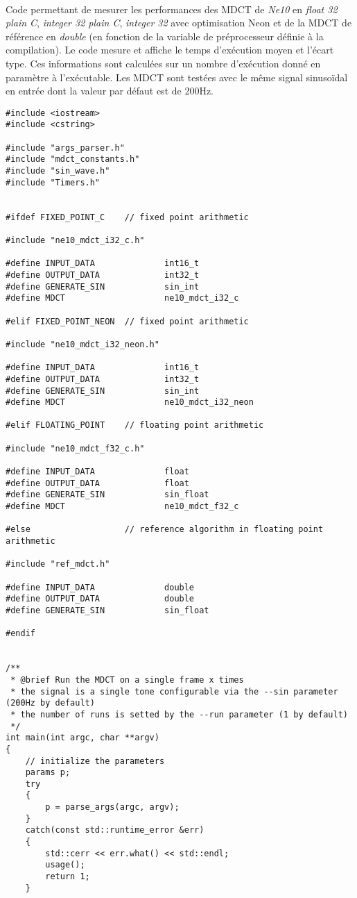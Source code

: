 \documentclass{article}
\begin{document}
\paragraph{}
Code permettant de mesurer les performances des MDCT de \emph{Ne10} en \emph{float 32 plain C}, \emph{integer 32 plain C}, \emph{integer 32} avec optimisation Neon et de la MDCT de référence en \emph{double} (en fonction de la variable de préprocesseur définie à la compilation). Le code mesure et affiche le temps d'exécution moyen et l'écart type. Ces informations sont calculées sur un nombre d'exécution donné en paramètre à l'exécutable. Les MDCT sont testées avec le même signal sinusoïdal en entrée dont la valeur par défaut est de 200Hz.
\lstset{language=C++}
\begin{lstlisting}
#include <iostream>
#include <cstring>

#include "args_parser.h"
#include "mdct_constants.h"
#include "sin_wave.h"
#include "Timers.h"


#ifdef FIXED_POINT_C    // fixed point arithmetic

#include "ne10_mdct_i32_c.h"

#define INPUT_DATA              int16_t
#define OUTPUT_DATA             int32_t
#define GENERATE_SIN            sin_int
#define MDCT                    ne10_mdct_i32_c

#elif FIXED_POINT_NEON  // fixed point arithmetic

#include "ne10_mdct_i32_neon.h"

#define INPUT_DATA              int16_t
#define OUTPUT_DATA             int32_t
#define GENERATE_SIN            sin_int
#define MDCT                    ne10_mdct_i32_neon

#elif FLOATING_POINT    // floating point arithmetic

#include "ne10_mdct_f32_c.h"

#define INPUT_DATA              float
#define OUTPUT_DATA             float
#define GENERATE_SIN            sin_float
#define MDCT                    ne10_mdct_f32_c

#else                   // reference algorithm in floating point arithmetic

#include "ref_mdct.h"

#define INPUT_DATA              double
#define OUTPUT_DATA             double
#define GENERATE_SIN            sin_float

#endif


/**
 * @brief Run the MDCT on a single frame x times
 * the signal is a single tone configurable via the --sin parameter (200Hz by default)
 * the number of runs is setted by the --run parameter (1 by default)
 */
int main(int argc, char **argv)
{
    // initialize the parameters
    params p;
    try
    {
        p = parse_args(argc, argv);
    }
    catch(const std::runtime_error &err)
    {
        std::cerr << err.what() << std::endl;
        usage();
        return 1;
    }


\end{lstlisting}
\end{document}
